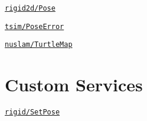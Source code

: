 
\begin{DoxyItemize}
\item \href{msg/Pose.html}{\tt rigid2d/\+Pose}
\item \href{msg/PoseError.html}{\tt tsim/\+Pose\+Error}
\item \href{msg/TurtleMap.html}{\tt nuslam/\+Turtle\+Map}
\end{DoxyItemize}

\section*{Custom Services}


\begin{DoxyItemize}
\item \href{srv/SetPose.html}{\tt rigid/\+Set\+Pose} 
\end{DoxyItemize}